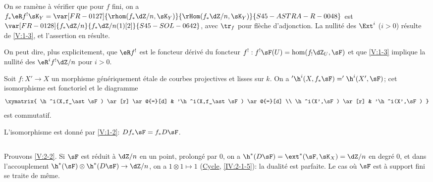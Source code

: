 On se ramène à vérifier que pour $f$ fini, on a 
$f_\ast \eR f^!\sK_Y = \var[FR-0127]{\rhom(f_\ast\dZ/n,\sK_Y)}{\rHom(f_\ast\dZ/n,\sK_Y)}{S45-ASTRA-R-0048}$ est $\var[FR-0128]{f_\ast\dZ/n}{f_\ast\dZ/n(1)[2]}{S45-SOL-0642}$, avec $\tr_f$ 
pour flèche d'adjonction. La nullité des $\Ext^i$ ($i>0$) résulte de 
\ref{V:1-3}, et l'assertion en résulte. 

On peut dire, plus explicitement, que $\eR f^!$ est le foncteur dérivé du 
foncteur $f^!:f^!\sF(U)=\hom(f_!\dZ_U,\sF)$ et que \ref{V:1-3} implique la 
nullité des $\eR^i f^!\dZ/n$ pour $i>0$.





\begin{corollary_}\label{V:2-4}
Soit $f:X'\to X$ un morphisme génériquement étale de courbes 
projectives et lisses sur $k$. On a $'\h^i(X,f_\ast \sF)='\h^i(X',\sF)$; cet 
isomorphisme est fonctoriel et le diagramme 
\[\xymatrix{
  \h^i(X,f_\ast\sF) \ar[r] \ar@{=}[d] 
    & '\h^i(X,f_\ast\sF) \ar@{=}[d] \\
  \h^i(X',\sF) \ar[r] 
    & '\h^i(X',\sF) 
}\]
est commutatif.
\end{corollary_}

L'isomorphisme est donné par \ref{V:1-2}: $D f_\ast\sF=f_\ast D\sF$. 





\subsection{}\label{V:2-5}

Prouvons \ref{V:2-2}. Si $\sF$ est réduit à $\dZ/n$ en un point, prolongé 
par $0$, on a $\h^*(D\sF) = \ext^*(\sF,\sK_X)=\dZ/n$ en degré 
$0$, et dans l'accouplement $\h^*(\sF)\otimes\h^*(D\sF) \to \dZ/n$, 
on a $1\otimes 1\mapsto 1$ (\hyperref[IV]{Cycle}, \ref{IV:2-1-5}): la dualité 
est parfaite. Le cas où $\sF$ est à support fini se traite de même. 

